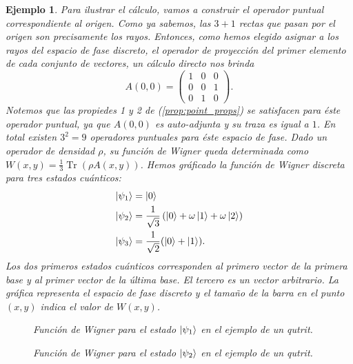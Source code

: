\documentclass[a4paper,11pt]{report}
\DeclareMathOperator{\Tr}{Tr}
\newtheorem{example}{Ejemplo}
\begin{document}
\begin{example}
    Para ilustrar el cálculo, vamos a construir el operador
    puntual correspondiente al origen. Como ya sabemos, las
    $3+1$ rectas que pasan por el origen son precisamente
    los rayos. Entonces, como hemos elegido asignar a los
    rayos del espacio de fase discreto, el operador de
    proyección del primer elemento de cada conjunto de
    vectores, un cálculo directo nos brinda
    \begin{equation}
      A(0,0)
      = \begin{pmatrix}
        1 & 0 & 0 \\
        0 & 0 & 1 \\
        0 & 1 & 0
      \end{pmatrix}. 
    \end{equation}
    Notemos que las propiedes 1 y 2 de
    (\ref{prop:point_props}) se satisfacen para éste
    operador puntual, ya que $A(0,0)$ es auto-adjunta y su
    traza es igual a $1$. En total existen $3^2 = 9$
    operadores puntuales para éste espacio de fase. Dado un
    operador de densidad $\rho$, su función de Wigner queda
    determinada como $W(x,y) = \frac{1}{3} \Tr(\rho
    A(x,y))$. Hemos gráficado la función de Wigner discreta
    para tres estados cuánticos:
    \begin{align}
      \ket{\psi_1}
      &= \ket 0 \\ 
      \ket{\psi_2}
      &= \frac{1}{\sqrt{3}}
      \left(
        \ket 0 + \omega \ket 1 + \omega \ket 2
      \right) \\
      \ket{\psi_3}
      &= \frac{1}{\sqrt{2}} (\ket 0 + \ket 1).
    \end{align}
    Los dos primeros estados cuánticos corresponden al
    primero vector de la primera base y al primer vector de
    la última base. El tercero es un vector arbitrario. La
    gráfica representa el espacio de fase discreto y el
    tamaño de la barra en el punto $(x,y)$ indica el valor
    de $W(x,y)$.

    \begin{figure}[ht]
      \centering
      \scalebox{0.7}{
        
      }
      \caption{Función de Wigner para el estado
        $\ket{\psi_1}$ en el ejemplo de un qutrit.}
      \label{fig:wigner-desargues-3-1-s1}
    \end{figure}

    \begin{figure}[ht]
      \centering
      \scalebox{0.7}{
        
      }
      \caption{Función de Wigner para el estado
        $\ket{\psi_2}$ en el ejemplo de un qutrit.}
      \label{fig:wigner-desargues-3-1-s2}
    \end{figure}
    

\end{example}
\end{document}
